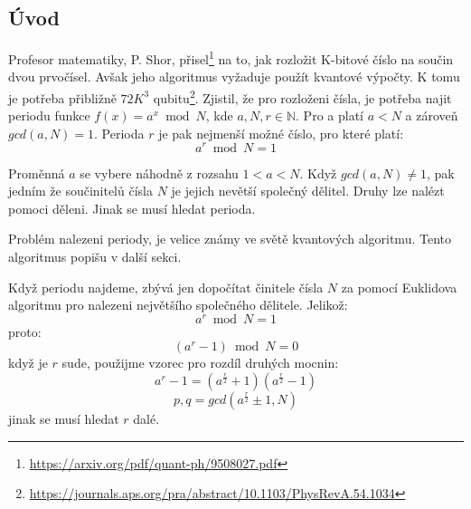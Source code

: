 \documentclass[11pt]{article}
\begin{document}
\subsection{Úvod}
Profesor matematiky, P. Shor, přisel\footnote{\url{https://arxiv.org/pdf/quant-ph/9508027.pdf}} na to, jak rozložit K-bitové číslo na součin dvou prvočísel.
Avšak jeho algoritmus vyžaduje použít kvantové výpočty.
K tomu je potřeba přibližně $72K^3$ qubitu\footnote{\url{https://journals.aps.org/pra/abstract/10.1103/PhysRevA.54.1034}}.
Zjistil, že pro rozloženi čísla, je potřeba najit periodu funkce $f(x) = a^x \bmod N$, kde $a, N, r \in \mathbb{N}$.
Pro a platí $a < N$ a zároveň $gcd(a, N) = 1$.
Perioda $r$ je pak nejmenší možné číslo, pro které platí:
$$a^r \bmod N = 1$$
\par Proměnná $a$ se vybere náhodně z rozsahu $1 < a < N$.
Když $gcd(a, N) \ne 1$, pak jedním že součinitelů čísla $N$ je jejich nevětší společný dělitel.
Druhy lze nalézt pomoci děleni. Jinak se musí hledat perioda.
\par Problém nalezeni periody, je velice známy ve světě kvantových algoritmu.
Tento algoritmus popišu v další sekci.
\par Když periodu najdeme, zbývá jen dopočítat činitele čísla $N$ za pomocí Euklidova algoritmu pro nalezeni největšího společného dělitele.
Jelikož:
$$a^r \bmod N = 1$$
proto:
$$(a^r - 1) \bmod N = 0$$
když je $r$ sude, použijme vzorec pro rozdíl druhých mocnin:
$$a^r - 1 = (a^\frac{r}{2} + 1)(a^\frac{r}{2} - 1)$$
$$p, q = gcd(a^\frac{r}{2} \pm 1, N)$$
jinak se musí hledat $r$ dalé.
\end{document}
